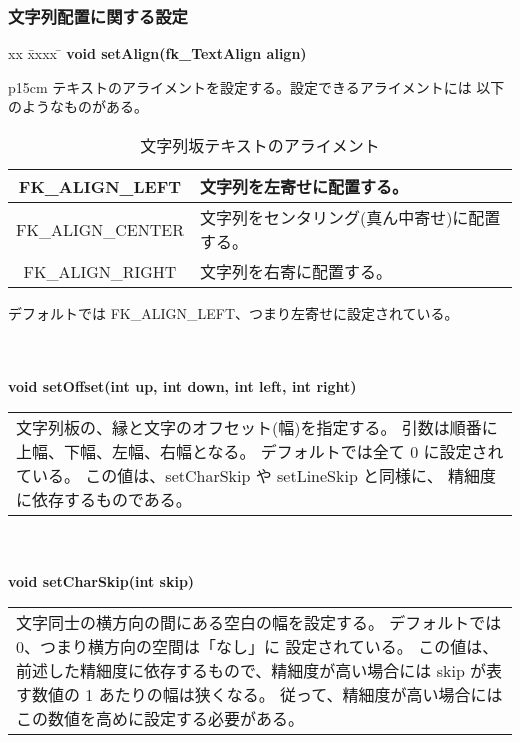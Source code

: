 \subsubsection{文字列配置に関する設定}
\begin{tabbing}
xx \= xxxx \= \kill
\> \textbf{void setAlign(fk\_TextAlign align)} \\
	\> \> \begin{tabular}{p{15cm}}
		テキストのアライメントを設定する。設定できるアライメントには
		以下のようなものがある。
			\begin{table}[H]
			\caption{文字列坂テキストのアライメント}
			\label{tbl:textAlign}
			\begin{center}
			\begin{tabular}{|c|l|}
			\hline
			FK\_ALIGN\_LEFT & 文字列を左寄せに配置する。\\ \hline
			FK\_ALIGN\_CENTER &
			文字列をセンタリング(真ん中寄せ)に配置する。\\ \hline
			FK\_ALIGN\_RIGHT & 文字列を右寄に配置する。\\ \hline
			\end{tabular}
			\end{center}
			\end{table}
		デフォルトでは FK\_ALIGN\_LEFT、つまり左寄せに設定されている。
	\end{tabular} \\ \\

\> \textbf{void setOffset(int up, int down, int left, int right)} \\
	\> \> \begin{tabular}{p{15cm}}
		文字列板の、縁と文字のオフセット(幅)を指定する。
		引数は順番に上幅、下幅、左幅、右幅となる。
		デフォルトでは全て 0 に設定されている。
		この値は、setCharSkip や setLineSkip と同様に、
		精細度に依存するものである。
	\end{tabular} \\ \\

\> \textbf{void setCharSkip(int skip)} \\
	\> \> \begin{tabular}{p{15cm}}
		文字同士の横方向の間にある空白の幅を設定する。
		デフォルトでは 0、つまり横方向の空間は「なし」に
		設定されている。
		この値は、前述した精細度に依存するもので、精細度が高い場合には
		skip が表す数値の 1 あたりの幅は狭くなる。
		従って、精細度が高い場合には
		この数値を高めに設定する必要がある。
	\end{tabular} \\ \\


\end{tabbing}
